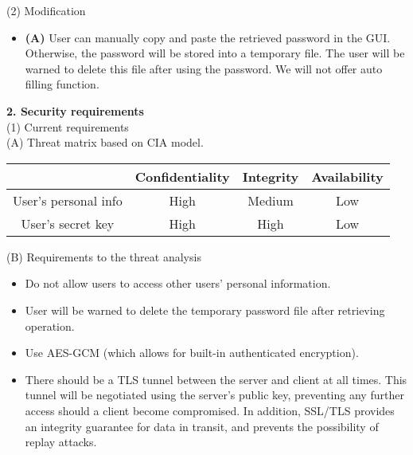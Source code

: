 \documentclass[11pt, letterpaper]{article}
\newcommand{\DesignSection}[1]
{\noindent\textbf{#1}\\}
\begin{document}
\smallskip
\noindent(2) Modification
\begin{itemize} \itemsep1pt \parskip0pt 
    \item \textbf{(A) }User can manually copy and paste the retrieved password in the \ac{GUI}. Otherwise, the password will be stored into a temporary file. The user will be warned to delete this file after using the password. We will not offer auto filling function.
\end{itemize}

\DesignSection{2. Security requirements}
\noindent(1) Current requirements\\
\indent(A) Threat matrix based on CIA model.

\setlength{\tabcolsep}{5pt}
\indent\begin{tabular}{| c | c | c | c |}
    \toprule
      & Confidentiality & Integrity & Availability \\
    \midrule
    User's personal info & High & Medium & Low \\
    \midrule
    User's secret key & High & High & Low \\
    \bottomrule
\end{tabular}

\smallskip
\indent(B) Requirements to the threat analysis
\begin{itemize} \itemsep1pt \parskip0pt 
    \item Do not allow users to access other users’ personal information.
    \item User will be warned to delete the temporary password file after retrieving operation.
    \item Use \ac{AES-GCM} (which allows for built-in authenticated encryption).
    \item There should be a \ac{TLS} tunnel between the server and client at all times. This tunnel will be negotiated using the server’s public key, preventing any further access should a client become compromised. In addition, \ac{SSL}/\ac{TLS} provides an integrity guarantee for data in transit, and prevents the possibility of replay attacks.
\end{itemize}
\end{document}

